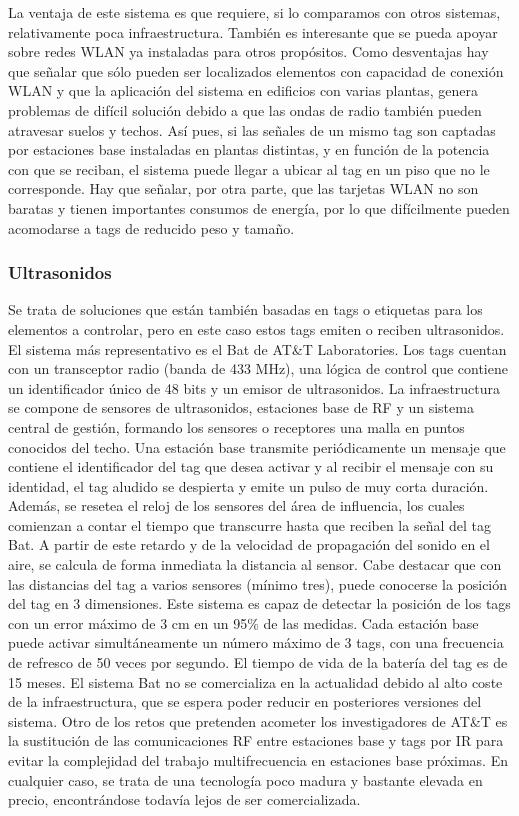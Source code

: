 La ventaja de este sistema es que requiere, si lo comparamos con otros sistemas, relativamente poca infraestructura. También es interesante que se pueda apoyar sobre redes WLAN ya instaladas para otros propósitos. Como desventajas hay que señalar que sólo pueden ser localizados elementos con capacidad de conexión WLAN y que la aplicación del sistema en edificios con varias plantas, genera problemas de difícil solución debido a que las ondas de radio también pueden atravesar suelos y techos. Así pues, si las señales de un mismo tag son captadas por estaciones base instaladas en plantas distintas, y en función de la potencia con que se reciban, el sistema puede llegar a ubicar al tag en un piso que no le corresponde. Hay que señalar, por otra parte, que las tarjetas WLAN no son baratas y tienen importantes consumos de energía, por lo que difícilmente pueden acomodarse a tags de reducido peso y tamaño. 

\subsubsection{Ultrasonidos}

Se trata de soluciones que están también basadas en tags o etiquetas para los elementos a controlar, pero en este caso estos tags emiten o reciben ultrasonidos. El sistema más representativo es el Bat de AT\&T Laboratories. Los tags cuentan con un transceptor radio (banda de 433 MHz), una lógica de control que contiene un identificador único de 48 bits y un emisor de ultrasonidos. La infraestructura se compone de sensores de ultrasonidos, estaciones base de RF y un sistema central de gestión, formando los sensores o receptores una malla en puntos conocidos del techo. Una estación base transmite periódicamente un mensaje que contiene el identificador del tag que desea activar y al recibir el mensaje con su identidad, el tag aludido se despierta y emite un pulso de muy corta duración. Además, se resetea el reloj de los sensores del área de influencia, los cuales comienzan a contar el tiempo que transcurre hasta que reciben la señal del tag Bat. A partir de este retardo y de la velocidad de propagación del sonido en el aire, se calcula de forma inmediata la distancia al sensor. Cabe destacar que con las distancias del tag a varios sensores (mínimo tres), puede conocerse la posición del tag en 3 dimensiones. Este sistema es capaz de detectar la posición de los tags con un error máximo de 3 cm en un 95\% de las medidas. Cada estación base puede activar simultáneamente un número máximo de 3 tags, con una frecuencia de refresco de 50 veces por segundo. El tiempo de vida de la batería del tag es de 15 meses. El sistema Bat no se comercializa en la actualidad debido al alto coste de la infraestructura, que se espera poder reducir en posteriores versiones del sistema. Otro de los retos que pretenden acometer los investigadores de AT\&T es la sustitución de las comunicaciones RF entre estaciones base y tags por IR para evitar la complejidad del trabajo multifrecuencia en estaciones base próximas. En cualquier caso, se trata de una tecnología poco madura y bastante elevada en precio, encontrándose todavía lejos de ser comercializada. 

